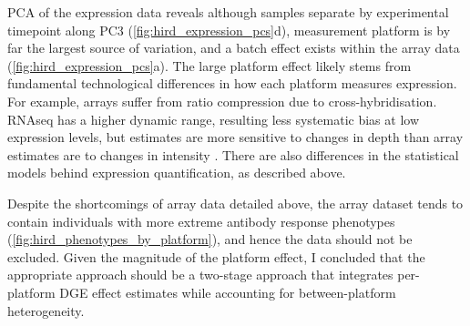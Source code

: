 \gls{PCA} of the expression data reveals although samples separate by experimental timepoint along \gls{PC}3 (\autoref{fig:hird_expression_pcs}d), measurement platform is by far the largest source of variation, and a batch effect exists within the array data (\autoref{fig:hird_expression_pcs}a).
%
The large platform effect likely stems from fundamental technological differences in how each platform measures expression.
For example, arrays suffer from ratio compression due to cross-hybridisation\autocite{draghici2006ReliabilityReproducibilityIssues}.
\gls{RNAseq} has a higher dynamic range, resulting less systematic bias at low expression levels, but estimates are more sensitive to changes in depth than array estimates are to changes in intensity \autocite{robinson2015NestedParallelExperiment}.
There are also differences in the statistical models behind expression quantification, as described above.

Despite the shortcomings of array data detailed above, the array dataset tends to contain individuals with more extreme antibody response phenotypes (\autoref{fig:hird_phenotypes_by_platform}), and hence the data should not be excluded.
Given the magnitude of the platform effect, I concluded that the appropriate approach should be a two-stage approach that integrates per-platform \gls{DGE} effect estimates while accounting for between-platform heterogeneity.

